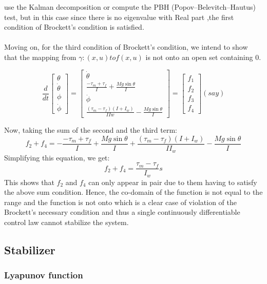 \documentclass{article}
\begin{document}
use the Kalman decomposition or compute the PBH (Popov–Belevitch–Hautus) test, but in this case
since there is no eigenvalue with Real part ,the first condition of Brockett's condition is satisfied.
\\
\\
Moving on, for the third condition of Brockett's condition, we intend to show that the mapping from 
\( \gamma : (x, u) to f(x, u) \) is not onto an open set containing 0.
\begin{center}
\[
\frac{d}{dt}
\begin{bmatrix}
\theta \\
\dot{\theta} \\
\phi \\
\dot{\phi} 
\end{bmatrix}
=
\begin{bmatrix}
\dot{\theta} \\
\frac{-\tau_m + \tau_f}{I} + \frac{Mg\sin\theta}{I} \\
\dot{\phi} \\
\frac{(\tau_m - \tau_f)(I + I_w)}{IIw} - \frac{Mg \sin\theta}{I}
\end{bmatrix}
=
\begin{bmatrix}
f_1\\
f_2\\
f_3\\
f_4
\end{bmatrix}
(say)
\]
\end{center}
Now, taking the sum of the second and the third term:
\[
f_2 + f_4 = -\frac{-\tau_m + \tau_f}{I} + \frac{Mg\sin{\theta}}{I} + \frac{(\tau_m - \tau_f)(I + I_w)}{II_w}- \frac{Mg\sin{\theta}}{I}
\]
Simplifying this equation, we get:
\[
f_2 + f_4 = \frac{\tau_m - \tau_f}{I_w}s
\]
This shows that \(f_2 \) and \(f_4\) can only appear in pair due to them having to satisfy the above sum condition.
Hence, the co-domain of the function is not equal to the range and the function is not onto which is a clear case of 
violation of the Brockett's necessary condition and thus a single continuously differentiable control law cannot stabilize the system.
\subsection{Stabilizer}

\subsubsection*{Lyapunov function}
\end{document}
